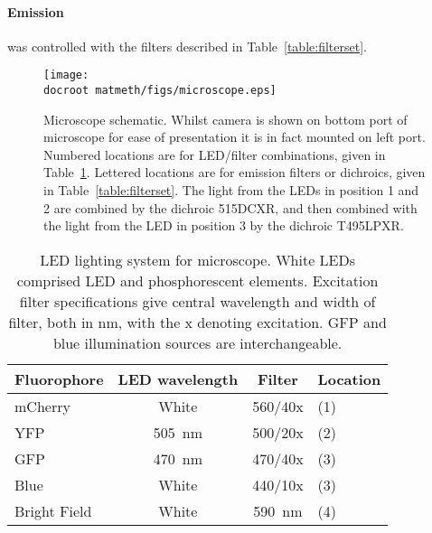\documentclass[../main.tex]{subfiles}
\begin{document}
\paragraph{Emission} was controlled with the filters described in Table~\ref{table:filterset}.
\begin{figure}[p]
\begin{center}
\texttt{[image: \\docroot matmeth/figs/microscope.eps]}
\caption[Microscope schematic]{Microscope schematic. Whilst camera is shown on bottom port of microscope for ease of presentation it is in fact mounted on left port. Numbered locations are for LED/filter combinations, given in Table~\ref{table:ledlighting}. Lettered locations are for emission filters or dichroics,  given in Table~\ref{table:filterset}. The light from the LEDs in position 1 and 2 are combined by the dichroic 515DCXR, and then combined with the light from the LED in position 3 by the dichroic T495LPXR.}
\label{fig:microscope}
\end{center}
\end{figure}
\begin{table}[p]
\begin{center}
\begin{tabular}{l|c|c|l}
\textbf{Fluorophore}	&	\textbf{LED wavelength}	&	\textbf{Filter}	&	\textbf{Location} \\\hline
mCherry	&	White	&	560/40x	&	(1)	\\
YFP		&	\SI{505}{\nano\meter}		&	500/20x	&	(2)\\
GFP		&	\SI{470}{\nano\meter}		&	470/40x	&	(3)\\
Blue		&	White	&	440/10x	&	(3)\\
Bright Field		&	White	&	\SI{590}{\nano\meter}	&	(4)
\end{tabular}
\caption[LED lighting system]{LED lighting system for microscope. White LEDs comprised LED and phosphorescent elements. Excitation filter specifications give central wavelength and width of filter, both in \si{\nano\meter}, with the x denoting excitation. GFP and blue illumination sources are interchangeable.}
\label{table:ledlighting}
\end{center}
\end{table}
\end{document}

